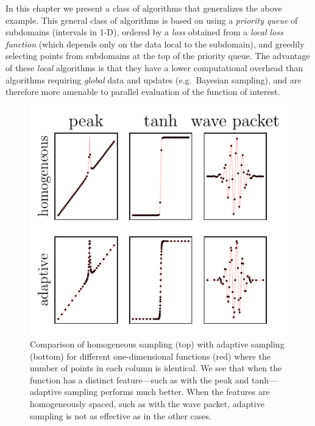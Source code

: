 In this chapter we present a class of algorithms that generalizes the above example.
This general class of algorithms is based on using a \emph{priority queue} of subdomains (intervals in 1-D), ordered by a \emph{loss} obtained from a \emph{local loss function} (which depends only on the data local to the subdomain), and greedily selecting points from subdomains at the top of the priority queue.
The advantage of these \emph{local} algorithms is that they have a lower computational overhead than algorithms requiring \emph{global} data and updates (e.g.~Bayesian sampling), and are therefore more amenable to parallel evaluation of the function of interest.

\begin{figure}
\centering
\includegraphics{chapter_adaptive/figures/Learner1D.pdf}
\caption{Comparison of homogeneous sampling (top) with adaptive sampling (bottom) for different one-dimensional functions (red) where the number of points in each column is identical.
We see that when the function has a distinct feature---such as with the peak and tanh---adaptive sampling performs much better.
When the features are homogeneously spaced, such as with the wave packet, adaptive sampling is not as effective as in the other cases.\label{fig:Learner1D}}
\end{figure}

